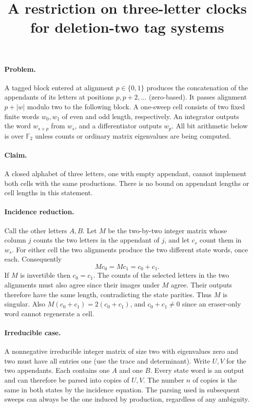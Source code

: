\documentclass{article}
\title{A restriction on three-letter clocks for deletion-two tag systems}
\author{}
\date{}
\begin{document}
\maketitle

\paragraph{Problem.}
A tagged block entered at alignment $p\in\{0,1\}$ produces the
concatenation of the appendants of its letters at positions $p,p+2,\ldots$
(zero-based). It passes alignment $p+|w|$ modulo two to the following
block. A one-sweep cell consists of two fixed finite words $w_0,w_1$
of even and odd length, respectively. An integrator outputs the word
$w_{s+p}$ from $w_s$, and a differentiator outputs $w_p$.
All bit arithmetic below is over $\mathbb F_2$ unless counts or ordinary
matrix eigenvalues are being computed.

\paragraph{Claim.}
A closed alphabet of three letters, one with empty appendant, cannot
implement both cells with the same productions. There is no bound on
appendant lengths or cell lengths in this statement.

\paragraph{Incidence reduction.}
Call the other letters $A,B$. Let $M$ be the two-by-two integer matrix
whose column $j$ counts the two letters in the appendant of $j$, and
let $c_s$ count them in $w_s$. For either cell the two alignments
produce the two different state words, once each. Consequently
\[
 Mc_0=Mc_1=c_0+c_1.
\]
If $M$ is invertible then $c_0=c_1$. The counts of the selected
letters in the two alignments must also agree since their images under
$M$ agree. Their outputs therefore have the same length, contradicting
the state parities. Thus $M$ is singular. Also $M(c_0+c_1)=2(c_0+c_1)$,
and $c_0+c_1\ne0$ since an eraser-only word cannot regenerate a cell.

\paragraph{Irreducible case.}
A nonnegative irreducible integer matrix of size two with eigenvalues
zero and two must have all entries one (use the trace and determinant).
Write $U,V$ for the two appendants. Each contains one $A$ and one $B$.
Every state word is an output and can therefore be parsed into copies
of $U,V$. The number $n$ of copies is the same in both states by the
incidence equation. The parsing used in subsequent sweeps can always
be the one induced by production, regardless of any ambiguity.
\end{document}
